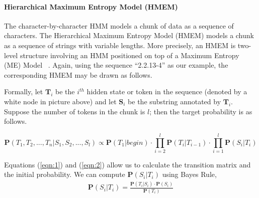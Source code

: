 \paragraph*{Hierarchical Maximum Entropy Model (HMEM)}\label{subsec:hmem}

The character-by-character HMM models a chunk of data as a sequence of
characters. The Hierarchical Maximum Entropy Model (HMEM) models a chunk as
a sequence of strings with variable lengths.
More precisely, an HMEM is two-level structure involving
an HMM positioned on top of 
a Maximum Entropy (ME) Model ~\cite{Berger96:ME,megaweb}.  Again,
using the sequence ``2.2.13-4'' as our example, the corresponding
HMEM may be drawn as follows.

\begin{center}
\end{center}


Formally, let $\mathbf{T}_i$ be the $i^{th}$ hidden state or token in the
sequence (denoted by a white node in picture above) and
let $\mathbf{S}_i$ be the substring annotated by $\mathbf{T}_i$. 
Suppose the number of tokens in the chunk is $l$; then the
target probability is as follows.

\begin{equation}
\mathbf{P}(T_1, T_2, ..., T_n|S_1, S_2, ..., S_l)  \propto
\mathbf{P}(T_1|begin) \cdot \prod_{i=2}^{l}{\mathbf{P}(T_i|T_{i-1})}
\cdot \prod_{i=1}^{l}\mathbf{P}(S_i|T_i)
\end{equation}

Equations (\ref{eqn:1}) and (\ref{eqn:2}) allow us to calculate
the transition matrix and the initial probability.
We can compute $\mathbf{P}(S_i|T_i)$ using Bayes Rule,
\begin{eqnarray} \label{eqn:bayes}
\mathbf{P}(S_i|T_i) = \frac{\mathbf{P}(T_i|S_i) \cdot
\mathbf{P}(S_i)}{\mathbf{P}(T_i)}
\end{eqnarray}

